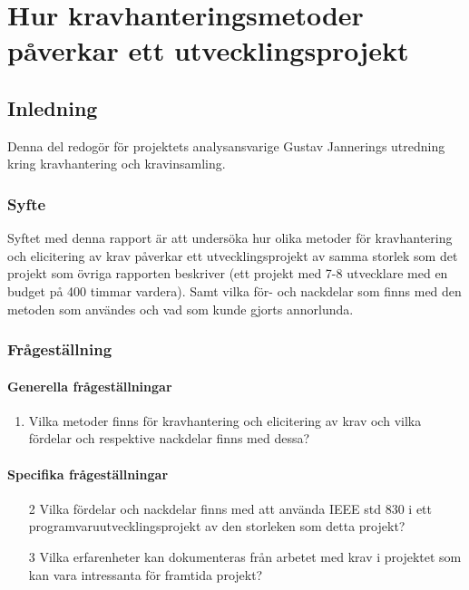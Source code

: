 \chapter{Hur kravhanteringsmetoder påverkar ett utvecklingsprojekt}
\label{cha:indiv-report-jannering}

\section{Inledning}
\label{sec:introduction-jannering}

Denna del redogör för projektets analysansvarige Gustav Jannerings utredning kring kravhantering och kravinsamling.

\subsection{Syfte}
\label{sec:purpose-jannering}


Syftet med denna rapport är att undersöka hur olika metoder för kravhantering och elicitering av krav påverkar ett utvecklingsprojekt av samma storlek som det projekt som övriga rapporten beskriver (ett projekt med 7-8 utvecklare med en budget på 400 timmar vardera). Samt vilka för- och nackdelar som finns med den metoden som användes och vad som kunde gjorts annorlunda.

\subsection{Frågeställning}
\label{sec:issue-jannering}

\subsubsection{Generella frågeställningar}
\begin{enumerate}
	\item Vilka metoder finns för kravhantering och elicitering av krav och vilka fördelar och respektive nackdelar finns med dessa? 
\end{enumerate}
\subsubsection{Specifika frågeställningar}
\begin{enumerate}
	\item [2] Vilka fördelar och nackdelar finns med att använda IEEE std 830 i ett programvaruutvecklingsprojekt av den storleken som detta projekt?
	
	\item [3] Vilka erfarenheter kan dokumenteras från arbetet med krav i projektet som kan vara intressanta för framtida projekt?
	
\end{enumerate}
